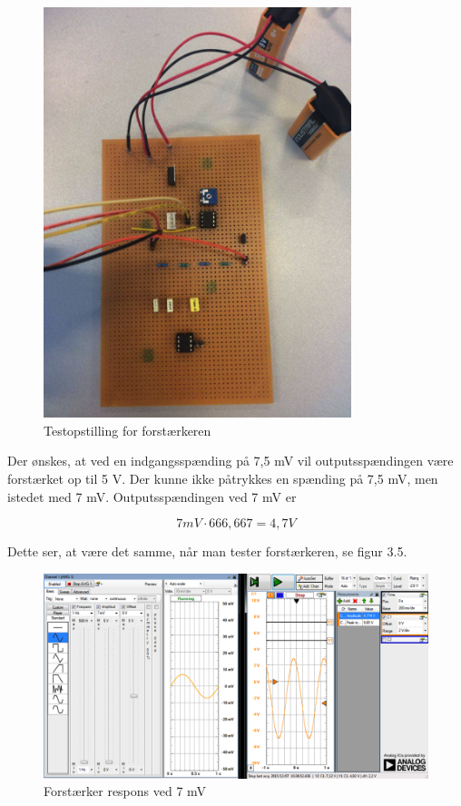 \begin{figure}[H]
	\centering
	\includegraphics[width=0.8\textwidth]{Figurer/Snip20151207_35}
	\caption{Testopstilling for forstærkeren}
\end{figure}

Der ønskes, at ved en indgangsspænding på 7,5 mV vil outputsspændingen være forstærket op til 5 V. Der kunne ikke påtrykkes en spænding på 7,5 mV, men istedet med 7 mV. Outputsspændingen ved 7 mV er 

\begin{equation}
	7 mV \cdot 666,667 = 4,7 V
\end{equation} 

Dette ser, at være det samme, når man tester forstærkeren, se figur 3.5. 

\begin{figure}[H]
	\centering
	\includegraphics[width=1\textwidth]{Figurer/Snip20151207_37}
	\caption{Forstærker respons ved 7 mV}
\end{figure}


